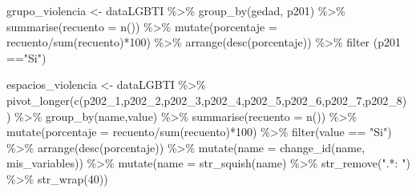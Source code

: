 \documentclass[
]{book}
\newenvironment{Shaded}{\begin{snugshade}}{\end{snugshade}}
\newcommand{\AttributeTok}[1]{\textcolor[rgb]{0.77,0.63,0.00}{#1}}
\newcommand{\DecValTok}[1]{\textcolor[rgb]{0.00,0.00,0.81}{#1}}
\newcommand{\FunctionTok}[1]{\textcolor[rgb]{0.00,0.00,0.00}{#1}}
\newcommand{\NormalTok}[1]{#1}
\newcommand{\OtherTok}[1]{\textcolor[rgb]{0.56,0.35,0.01}{#1}}
\newcommand{\SpecialCharTok}[1]{\textcolor[rgb]{0.00,0.00,0.00}{#1}}
\newcommand{\StringTok}[1]{\textcolor[rgb]{0.31,0.60,0.02}{#1}}
\theoremstyle{definition}
\theoremstyle{definition}
\theoremstyle{definition}
\theoremstyle{definition}
\theoremstyle{remark}
\begin{document}
\begin{Shaded}
\begin{Highlighting}[]
\NormalTok{grupo\_violencia }\OtherTok{\textless{}{-}}\NormalTok{ dataLGBTI }\SpecialCharTok{\%\textgreater{}\%} 
  \FunctionTok{group\_by}\NormalTok{(gedad, p201) }\SpecialCharTok{\%\textgreater{}\%} 
  \FunctionTok{summarise}\NormalTok{(}\AttributeTok{recuento =} \FunctionTok{n}\NormalTok{()) }\SpecialCharTok{\%\textgreater{}\%} 
  \FunctionTok{mutate}\NormalTok{(}\AttributeTok{porcentaje =}\NormalTok{ recuento}\SpecialCharTok{/}\FunctionTok{sum}\NormalTok{(recuento)}\SpecialCharTok{*}\DecValTok{100}\NormalTok{) }\SpecialCharTok{\%\textgreater{}\%} 
  \FunctionTok{arrange}\NormalTok{(}\FunctionTok{desc}\NormalTok{(porcentaje)) }\SpecialCharTok{\%\textgreater{}\%} 
  \FunctionTok{filter}\NormalTok{ (p201 }\SpecialCharTok{==}\StringTok{"Si"}\NormalTok{)}
\end{Highlighting}
\end{Shaded}

\begin{Shaded}
\begin{Highlighting}[]
\NormalTok{espacios\_violencia }\OtherTok{\textless{}{-}}\NormalTok{ dataLGBTI }\SpecialCharTok{\%\textgreater{}\%} 
  \FunctionTok{pivot\_longer}\NormalTok{(}\FunctionTok{c}\NormalTok{(p202\_1,p202\_2,p202\_3,p202\_4,p202\_5,p202\_6,p202\_7,p202\_8)) }\SpecialCharTok{\%\textgreater{}\%} 
  \FunctionTok{group\_by}\NormalTok{(name,value) }\SpecialCharTok{\%\textgreater{}\%} 
  \FunctionTok{summarise}\NormalTok{(}\AttributeTok{recuento =} \FunctionTok{n}\NormalTok{()) }\SpecialCharTok{\%\textgreater{}\%} 
  \FunctionTok{mutate}\NormalTok{(}\AttributeTok{porcentaje =}\NormalTok{ recuento}\SpecialCharTok{/}\FunctionTok{sum}\NormalTok{(recuento)}\SpecialCharTok{*}\DecValTok{100}\NormalTok{) }\SpecialCharTok{\%\textgreater{}\%} 
  \FunctionTok{filter}\NormalTok{(value }\SpecialCharTok{==} \StringTok{"Si"}\NormalTok{) }\SpecialCharTok{\%\textgreater{}\%} 
  \FunctionTok{arrange}\NormalTok{(}\FunctionTok{desc}\NormalTok{(porcentaje)) }\SpecialCharTok{\%\textgreater{}\%} 
  \FunctionTok{mutate}\NormalTok{(}\AttributeTok{name =} \FunctionTok{change\_id}\NormalTok{(name, mis\_variables)) }\SpecialCharTok{\%\textgreater{}\%} 
  \FunctionTok{mutate}\NormalTok{(}\AttributeTok{name =} \FunctionTok{str\_squish}\NormalTok{(name) }\SpecialCharTok{\%\textgreater{}\%} \FunctionTok{str\_remove}\NormalTok{(}\StringTok{".*: "}\NormalTok{) }\SpecialCharTok{\%\textgreater{}\%} \FunctionTok{str\_wrap}\NormalTok{(}\DecValTok{40}\NormalTok{))}
\end{Highlighting}
\end{Shaded}
\end{document}
